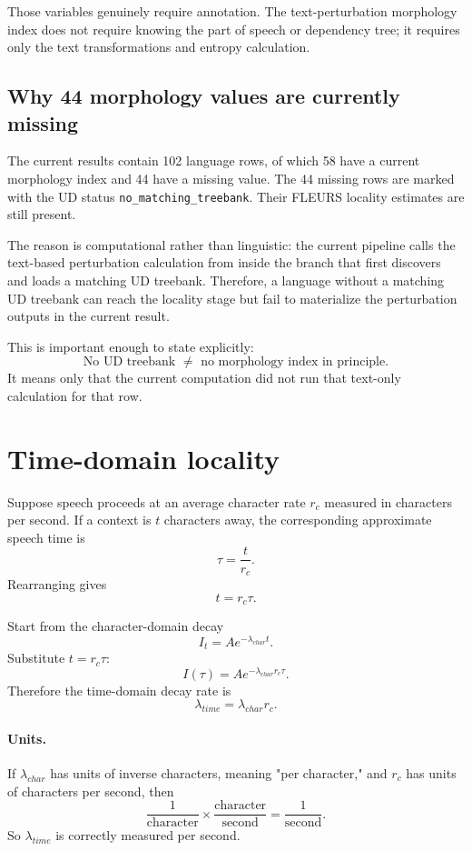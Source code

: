 \documentclass[11pt]{article}
\begin{document}
Those variables genuinely require annotation. The text-perturbation morphology index does not require knowing the part of speech or dependency tree; it requires only the text transformations and entropy calculation.

\subsection{Why 44 morphology values are currently missing}
The current results contain 102 language rows, of which 58 have a current morphology index and 44 have a missing value. The 44 missing rows are marked with the UD status \texttt{no\_matching\_treebank}. Their FLEURS locality estimates are still present.

The reason is computational rather than linguistic: the current pipeline calls the text-based perturbation calculation from inside the branch that first discovers and loads a matching UD treebank. Therefore, a language without a matching UD treebank can reach the locality stage but fail to materialize the perturbation outputs in the current result.

This is important enough to state explicitly:
\[
\boxed{\text{No UD treebank }\neq\text{ no morphology index in principle}.}
\]
It means only that the current computation did not run that text-only calculation for that row.

\newpage
\section{Time-domain locality}
Suppose speech proceeds at an average character rate $r_c$ measured in characters per second. If a context is $t$ characters away, the corresponding approximate speech time is
\[
\tau=\frac{t}{r_c}.
\]
Rearranging gives
\[
t=r_c\tau.
\]

Start from the character-domain decay
\[
I_t=Ae^{-\lambda_{char}t}.
\]
Substitute $t=r_c\tau$:
\[
I(\tau)=Ae^{-\lambda_{char}r_c\tau}.
\]
Therefore the time-domain decay rate is
\[
\boxed{\lambda_{time}=\lambda_{char}r_c.}
\]

\paragraph{Units.}
If $\lambda_{char}$ has units of inverse characters, meaning "per character," and $r_c$ has units of characters per second, then
\[
\frac{1}{\text{character}}
\times
\frac{\text{character}}{\text{second}}
=
\frac{1}{\text{second}}.
\]
So $\lambda_{time}$ is correctly measured per second.
\end{document}
